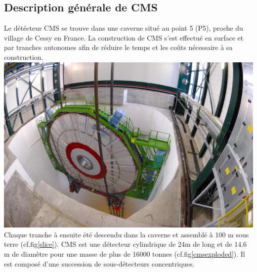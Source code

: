 \subsection{Description générale de CMS}
Le détécteur CMS se trouve dans une caverne situé au point 5 (P5), proche du village de Cessy en France. La construction de CMS s'est effectué en surface et par tranches autonomes afin de réduire le temps et les coûts nécessaire à sa construction.
\marginpar
{
	\includegraphics[width=\marginparwidth]{CMS/slice.jpg}
	\label{slice}
}
Chaque tranche à ensuite été descendu dans la caverne et assemblé à 100 m sous terre (cf.fig\ref{slice}).
CMS est une détecteur cylindrique de 24m de long et de 14.6 m de diamètre pour une masse de plus de 16000 tonnes (cf.fig\ref{cmsexploded}). Il est composé d'une succession de sous-détecteurs concentriques.

